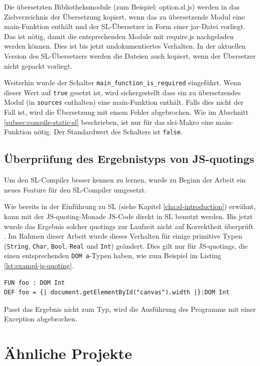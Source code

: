 \documentclass[12pt,bibtotoc]{scrreprt}
\begin{document}
Die übersetzten Bibliotheksmodule (zum Beispiel: option.sl.js) werden in das Zielverzeichnis der Übersetzung kopiert, wenn das zu übersetzende Modul eine main-Funktion enthält und der SL-Übersetzer in Form einer jar-Datei vorliegt. Das ist nötig, damit die entsprechenden Module mit require.js nachgeladen werden können. Dies ist bis jetzt undokumentiertes Verhalten. In der aktuellen Version des SL-Übersetzers werden die Dateien auch kopiert, wenn der Übersetzer nicht gepackt vorliegt.

Weiterhin wurde der Schalter \lstinline!main_function_is_required! eingeführt. Wenn dieser Wert auf \lstinline!true! gesetzt ist, wird sichergestellt dass ein zu übersetzendes Modul (in \lstinline!sources! enthalten) eine main-Funktion enthält. Falls dies nicht der Fall ist, wird die Übersetzung mit einem Fehler abgebrochen. Wie im Abschnitt \ref{subsec:compile-static-sl} beschrieben, ist nur für das slci-Makro eine main-Funktion nötig. Der Standardwert des Schalters ist \lstinline!false!.

\section{Überprüfung des Ergebnistyps von JS-quotings}

Um den SL-Compiler besser kennen zu lernen, wurde zu Beginn der Arbeit ein neues Feature für den SL-Compiler umgesetzt.

Wie bereits in der Einführung zu SL (siehe Kapitel \ref{cha:sl-introduction}) erwähnt, kann mit der JS-quoting-Monade JS-Code direkt in SL benutzt werden. Bis jetzt wurde das Ergebnis solcher quotings zur Laufzeit nicht auf Korrektheit überprüft \cite[S. 29]{Bisping2013}. Im Rahmen dieser Arbeit wurde dieses Verhalten für einige primitive Typen (\lstinline!String!, \lstinline!Char!, \lstinline!Bool!, \lstinline!Real! und \lstinline!Int!) geändert. Dies gilt nur für JS-quotings, die einen entsprechenden \lstinline!DOM a!-Typen haben, wie zum Beispiel im Listing \ref{lst:exampl-js-quoting}.

\begin{lstlisting}[caption={Beispiel: JS-quoting-Monade}, label=lst:exampl-js-quoting]
FUN foo : DOM Int
DEF foo = {| document.getElementById("canvas").width |}:DOM Int
\end{lstlisting}

Passt das Ergebnis nicht zum Typ, wird die Ausführung des Programms mit einer Exception abgebrochen. 

\chapter{Ähnliche Projekte}
\label{chap:related-works}
\end{document}
